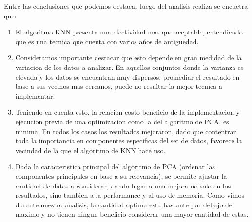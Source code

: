 
Entre las conclusiones que podemos destacar luego del analisis realiza se encuetra que:
\begin{enumerate}
 \item El algoritmo KNN presenta una efectividad mas que aceptable, entendiendo que es una tecnica que cuenta con varios años de antiguedad.
 \item Consideramos importante destacar que esto depende en gran medidad de la variacion de los datos a analizar. En aquellos conjuntos donde la varianza es elevada y los datos se encuentran muy dispersos, promediar el resultado en base a sus vecinos mas cercanos, puede no resultar la mejor tecnica a implementar.
 \item Teniendo en cuenta esto, la relacion costo-beneficio de la implementacion y ejecucion previa de una optimizacion como la del algoritmo de PCA, es minima. En todos los casos los resultados mejoraron, dado que contentrar toda la importancia en componentes especificas del set de datos, favorece la vecindad de la que el algoritmo de KNN hace uso.
 \item Dada la caracteristica principal del algoritmo de PCA (ordenar las componentes principales en base a su relevancia), se permite ajustar la cantidad de datos a considerar, dando lugar a una mejora no solo en los resultados, sino tambien a la performance y al uso de memoria. Como vimos durante nuestro analisis, la cantidad optima esta bastante por debajo del maximo y no tienen ningun beneficio considerar una mayor cantidad de estas.
\end{enumerate}